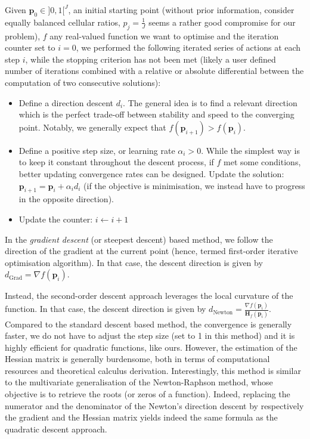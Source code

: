 \documentclass[long, final]{jobim}
\begin{document}
\begin{definition}
\label{def:iterative-optimisation}
    Given $\boldsymbol{p}_0\in ]0, 1[^J$, an initial starting point (without prior information, consider equally balanced cellular ratios, $p_j=\frac{1}{J}$ seems a rather good compromise for our problem), $f$ any real-valued function we want to optimise and the iteration counter set to $i=0$, we performed the following iterated series of actions at each step $i$, while the stopping criterion has not been met (likely a user defined number of iterations combined with a relative or absolute differential between the computation of two consecutive solutions):
        \begin{itemize}
    \item Define a direction descent $d_i$. The general idea is to find a relevant direction which is the perfect trade-off between stability and speed to the converging point. Notably, we generally expect that $f(\boldsymbol{p}_{i+1}) > f(\boldsymbol{p}_{i})$.

    \item Define a positive step size, or learning rate $\alpha_i > 0$. While the simplest way is to keep it constant throughout the descent process, if $f$ met some conditions, better updating convergence rates can be designed.  Update the solution: $\boldsymbol{p}_{i+1}=\boldsymbol{p}_i + \alpha_i d_i$ (if the objective is minimisation, we instead have to progress in the opposite direction).

    \item Update the counter: $i \leftarrow i + 1$

\end{itemize}

\end{definition}

In the \textit{gradient descent} (or steepest descent) based method, we follow the direction of the gradient at the current point (hence, termed first-order iterative optimisation algorithm). In that case, the descent direction is given by $d_{\text{Grad}}=\nabla f(\boldsymbol{p}_i)$.

Instead, the second-order descent approach leverages the local curvature of the function. In that case, the descent direction is given by $d_{\text{Newton}}= \frac{\nabla f(\boldsymbol{p}_i)}{\mathbf{H}_f(\boldsymbol{p}_i)}$. Compared to the standard descent based method, the convergence is generally faster, we do not have to adjust the step size (set to 1 in this method) and it is highly efficient for quadratic functions, like ours. However, the estimation of the Hessian matrix is generally burdensome, both in terms of computational resources and theoretical calculus derivation. Interestingly, this method is similar to the multivariate generalisation of the Newton-Raphson method, whose objective is to retrieve the roots (or zeros of a function). Indeed, replacing the numerator and the denominator of the Newton's direction descent by respectively the gradient and the Hessian matrix yields indeed the same formula as the quadratic descent approach.
\end{document}
